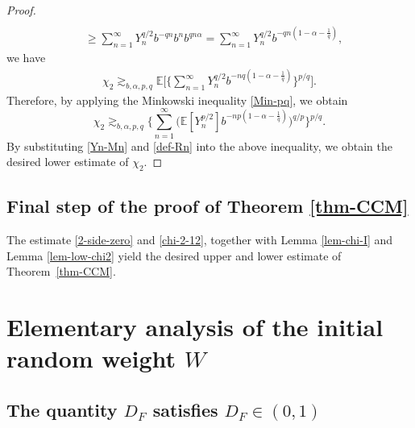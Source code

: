 \documentclass[12pt]{amsart}
\theoremstyle{definition}
\theoremstyle{remark}
\newcommand{\E}{\mathbb{E}}
\numberwithin{equation}{section}
\begin{document}
\begin{proof}
\begin{align*}
\\
&   \ge   \sum_{n=1}^\infty  Y_n^{q/2}   b^{-qn}   b^{n}  b^{qn\alpha }   = \sum_{n=1}^\infty  Y_n^{q/2}   b^{-qn(1-\alpha - \frac{1}{q})},
\end{align*}
we have 
\begin{align*}
\chi_2\gtrsim_{b,\alpha, p, q} \E\Big[ \Big\{ \sum_{n=1}^\infty  Y_n^{q/2}   b^{-nq (1 - \alpha - \frac{1}{q})}  \Big\}^{p/q}\Big].
\end{align*}
Therefore, by applying the Minkowski inequality \eqref{Min-pq}, we obtain 
\[
\chi_2 \gtrsim_{b, \alpha, p, q}   \Big\{ \sum_{n=1}^\infty  \Big(   \E[Y_n^{p/2}]  b^{-np (1-\alpha- \frac{1}{q})}    \Big)^{q/p} \Big\}^{p/q}.
\]
By substituting \eqref{Yn-Mn} and \eqref{def-Rn} into the above inequality, we  obtain the desired lower estimate of $\chi_2$. 
\end{proof}


\subsection{Final step of the proof of Theorem \ref{thm-CCM}}
The estimate \eqref{2-side-zero} and \eqref{chi-2-12}, together with Lemma \ref{lem-chi-I} and Lemma \ref{lem-low-chi2} yield the desired upper and lower estimate of  Theorem~\ref{thm-CCM}.






\section{Elementary analysis of the initial random weight $W$}\label{sec-W}



\subsection{The quantity $D_F$ satisfies $D_F\in (0,1)$}\label{sec-pos}
\end{document}
